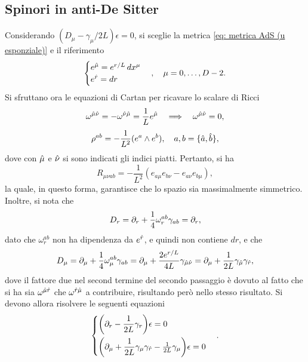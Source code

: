 \subsection{Spinori in anti-De Sitter}
Considerando $(D_\mu - \gamma_\mu/2L)\epsilon = 0$, si sceglie la metrica \eqref{eq: metrica AdS (u esponziale)} e il riferimento 
\begin{equation}
    \begin{cases}
        e^{\hat{\mu}} = e^{r/L}\,dx^\mu \\
        e^{\hat{r}} = dr
    \end{cases},\quad \mu = 0,\dots, D - 2.
\end{equation}
Si sfruttano ora le equazioni di Cartan per ricavare lo scalare di Ricci
\begin{equation}
    \omega^{\hat{\mu}\hat{\nu}} = -\omega^{\hat{\nu}\hat{\mu}} = \frac{1}{L}e^{\hat{\mu}}\quad\Longrightarrow\quad \omega^{\hat{\mu}\hat{\nu}} = 0,
\end{equation}
\begin{equation}
    \rho^{ab} = -\frac{1}{L^2}(e^a \wedge e^b),\quad a,b = \{\hat{a},\hat{b}\},
\end{equation}
dove con $\hat{\mu}$ e $\hat{\nu}$ si sono indicati gli indici piatti. Pertanto, si ha 
\begin{equation}
    R_{\mu\nu ab} = -\frac{1}{L^2}(e_{a\mu}e_{b\nu} - e_{a\nu}e_{b\mu}),
\end{equation}
la quale, in questo forma, garantisce che lo spazio sia massimalmente simmetrico. Inoltre, si nota che 
\begin{equation}
    D_r = \partial_r + \frac{1}{4}\omega^{ab}_r\gamma_{ab} = \partial_r,
\end{equation}
dato che $\omega^{ab}_r$ non ha dipendenza da $e^{\hat{r}}$, e quindi non contiene $dr$, e che 
\begin{equation}
    D_\mu = \partial_\mu + \frac{1}{4}\omega^{ab}_\mu\gamma_{ab} = \partial_\mu + \frac{2e^{r/L}}{4L}\gamma_{\hat{\mu}\hat{\nu}} = \partial_\mu + \frac{1}{2L}\gamma_{\hat{\mu}}\gamma_{\hat{r}},
\end{equation}
dove il fattore due nel second termine del secondo passaggio è dovuto al fatto che si ha sia $\omega^{\hat{\mu}\hat{r}}$ che $\omega^{\hat{r}\hat{\mu}}$ a contribuire, risultando però nello stesso risultato. Si devono allora risolvere le seguenti equazioni 
\begin{equation}
    \begin{cases}
        \bigg(\partial_r - \dfrac{1}{2L}\gamma_r\bigg)\epsilon = 0 \\[2ex] 
        \bigg(\partial_\mu + \dfrac{1}{2L}\gamma_\mu\gamma_{\hat{r}} - \frac{1}{2L}\gamma_\mu\bigg)\epsilon = 0
    \end{cases}.
\end{equation}

